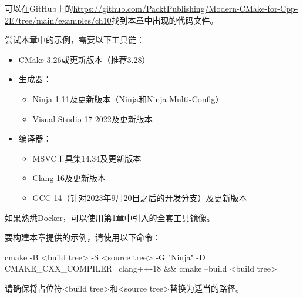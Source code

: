 可以在GitHub上的\url{https://github.com/PacktPublishing/Modern-CMake-for-Cpp-2E/tree/main/examples/ch10}找到本章中出现的代码文件。

尝试本章中的示例，需要以下工具链：

\begin{itemize}
\item
CMake 3.26或更新版本（推荐3.28）

\item
生成器：
\begin{itemize}
\item
Ninja 1.11及更新版本（Ninja和Ninja Multi-Config）

\item
Visual Studio 17 2022及更新版本
\end{itemize}

\item
编译器：
\begin{itemize}
\item
MSVC工具集14.34及更新版本

\item
Clang 16及更新版本

\item
GCC 14（针对2023年9月20日之后的开发分支）及更新版本
\end{itemize}
\end{itemize}

如果熟悉Docker，可以使用第1章中引入的全套工具镜像。

要构建本章提供的示例，请使用以下命令：

\begin{shell}
cmake -B <build tree> -S <source tree> -G "Ninja" -D CMAKE_CXX_COMPILER=clang++-18 && cmake --build <build tree>
\end{shell}

请确保将占位符<build tree>和<source tree>替换为适当的路径。












